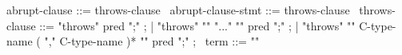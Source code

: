 \begin{syntax}
  abrupt-clause ::= throws-clause
  \
  abrupt-clause-stmt ::= throws-clause
  \
  throws-clause ::= "throws" pred ";" ;
                  | "throws" "{" "..." "}" pred ";" ;
                  | "throws" "{" C-type-name ( "," C-type-name )* "}" pred ";" ;
  \
  {term} ::= { "\exception" }
\end{syntax}
